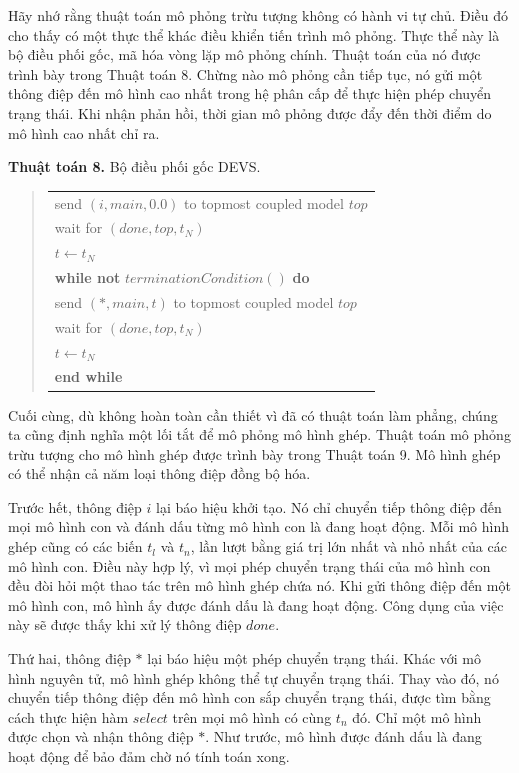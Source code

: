 Hãy nhớ rằng thuật toán mô phỏng trừu tượng không có hành vi tự chủ. Điều đó cho thấy có một thực thể khác điều khiển tiến trình mô phỏng. Thực thể này là bộ điều phối gốc, mã hóa vòng lặp mô phỏng chính. Thuật toán của nó được trình bày trong Thuật toán 8. Chừng nào mô phỏng cần tiếp tục, nó gửi một thông điệp đến mô hình cao nhất trong hệ phân cấp để thực hiện phép chuyển trạng thái. Khi nhận phản hồi, thời gian mô phỏng được đẩy đến thời điểm do mô hình cao nhất chỉ ra.

\noindent\textbf{Thuật toán 8.} Bộ điều phối gốc DEVS.
\begin{quote}
\small
\begin{tabular}{@{}l@{}}
send $(i,main,0.0)$ to topmost coupled model $top$\\
wait for $(done,top,t_N)$\\
$t\leftarrow t_N$\\
\textbf{while not} $terminationCondition()$ \textbf{do}\\
\quad send $(*,main,t)$ to topmost coupled model $top$\\
\quad wait for $(done,top,t_N)$\\
\quad $t\leftarrow t_N$\\
\textbf{end while}
\end{tabular}
\end{quote}

Cuối cùng, dù không hoàn toàn cần thiết vì đã có thuật toán làm phẳng, chúng ta cũng định nghĩa một lối tắt để mô phỏng mô hình ghép. Thuật toán mô phỏng trừu tượng cho mô hình ghép được trình bày trong Thuật toán 9. Mô hình ghép có thể nhận cả năm loại thông điệp đồng bộ hóa.

Trước hết, thông điệp $i$ lại báo hiệu khởi tạo. Nó chỉ chuyển tiếp thông điệp đến mọi mô hình con và đánh dấu từng mô hình con là đang hoạt động. Mỗi mô hình ghép cũng có các biến $t_l$ và $t_n$, lần lượt bằng giá trị lớn nhất và nhỏ nhất của các mô hình con. Điều này hợp lý, vì mọi phép chuyển trạng thái của mô hình con đều đòi hỏi một thao tác trên mô hình ghép chứa nó. Khi gửi thông điệp đến một mô hình con, mô hình ấy được đánh dấu là đang hoạt động. Công dụng của việc này sẽ được thấy khi xử lý thông điệp $done$.

Thứ hai, thông điệp $*$ lại báo hiệu một phép chuyển trạng thái. Khác với mô hình nguyên tử, mô hình ghép không thể tự chuyển trạng thái. Thay vào đó, nó chuyển tiếp thông điệp đến mô hình con sắp chuyển trạng thái, được tìm bằng cách thực hiện hàm $select$ trên mọi mô hình có cùng $t_n$ đó. Chỉ một mô hình được chọn và nhận thông điệp $*$. Như trước, mô hình được đánh dấu là đang hoạt động để bảo đảm chờ nó tính toán xong.

